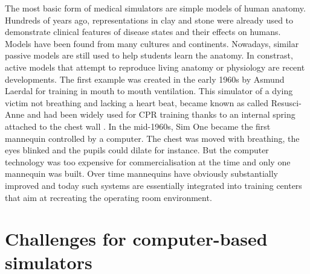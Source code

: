 \bigskip

The most basic form of medical simulators are simple models of human anatomy. Hundreds of years ago, representations in clay and stone were already used to demonstrate clinical features of disease states and their effects on humans. Models have been found from many cultures and continents. Nowadays, similar passive models are still used to help students learn the anatomy. In constrast, active models that attempt to reproduce living anatomy or physiology are recent developments. The first example was created in the early 1960s by Asmund Laerdal for training in mouth to mouth ventilation. This simulator of a dying victim not breathing and lacking a heart beat, became known as called Resusci-Anne and had been widely used for CPR training thanks to an internal spring attached to the chest wall \citep{Cooper04}. In the mid-1960s, Sim One became the first mannequin controlled by a computer. The chest was moved with breathing, the eyes blinked and the pupils could dilate for instance. But the computer technology was too expensive for commercialisation at the time and only one mannequin was built. Over time mannequins have obviously substantially improved and today such systems are essentially integrated into training centers that aim at recreating the operating room environment. 





\section{Challenges for computer-based simulators}
	
	
	
	
	